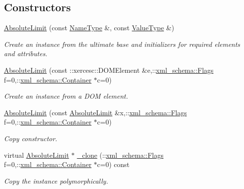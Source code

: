 \subsection*{Constructors}
\begin{DoxyCompactItemize}
\item 
\hypertarget{classopenstack_1_1xml_1_1AbsoluteLimit_a39ae7452a872800c9a12e8586b3f2c5a}{
\hyperlink{classopenstack_1_1xml_1_1AbsoluteLimit_a39ae7452a872800c9a12e8586b3f2c5a}{AbsoluteLimit} (const \hyperlink{classopenstack_1_1xml_1_1AbsoluteLimit_a17076646112ee014dd882aec5f44f272}{NameType} \&, const \hyperlink{classopenstack_1_1xml_1_1AbsoluteLimit_ade5fbfd6ef570b66c9ad22f8339ef3f6}{ValueType} \&)}
\label{classopenstack_1_1xml_1_1AbsoluteLimit_a39ae7452a872800c9a12e8586b3f2c5a}

\begin{DoxyCompactList}\small\item\em Create an instance from the ultimate base and initializers for required elements and attributes. \item\end{DoxyCompactList}\item 
\hyperlink{classopenstack_1_1xml_1_1AbsoluteLimit_a88b4025b11ee1e3023617df4212a31b6}{AbsoluteLimit} (const ::xercesc::DOMElement \&e,::\hyperlink{namespacexml__schema_affb4c227cbd9aa7453dd1dc5a1401943}{xml\_\-schema::Flags} f=0,::\hyperlink{namespacexml__schema_a333dea2213742aea47a37532dec4ec27}{xml\_\-schema::Container} $\ast$c=0)
\begin{DoxyCompactList}\small\item\em Create an instance from a DOM element. \item\end{DoxyCompactList}\item 
\hyperlink{classopenstack_1_1xml_1_1AbsoluteLimit_a676d19b61c9936e93b6b52d3391f763f}{AbsoluteLimit} (const \hyperlink{classopenstack_1_1xml_1_1AbsoluteLimit}{AbsoluteLimit} \&x,::\hyperlink{namespacexml__schema_affb4c227cbd9aa7453dd1dc5a1401943}{xml\_\-schema::Flags} f=0,::\hyperlink{namespacexml__schema_a333dea2213742aea47a37532dec4ec27}{xml\_\-schema::Container} $\ast$c=0)
\begin{DoxyCompactList}\small\item\em Copy constructor. \item\end{DoxyCompactList}\item 
virtual \hyperlink{classopenstack_1_1xml_1_1AbsoluteLimit}{AbsoluteLimit} $\ast$ \hyperlink{classopenstack_1_1xml_1_1AbsoluteLimit_a2ebc5efa77532368eec49ffb469438d8}{\_\-clone} (::\hyperlink{namespacexml__schema_affb4c227cbd9aa7453dd1dc5a1401943}{xml\_\-schema::Flags} f=0,::\hyperlink{namespacexml__schema_a333dea2213742aea47a37532dec4ec27}{xml\_\-schema::Container} $\ast$c=0) const 
\begin{DoxyCompactList}\small\item\em Copy the instance polymorphically. \item\end{DoxyCompactList}\end{DoxyCompactItemize}


